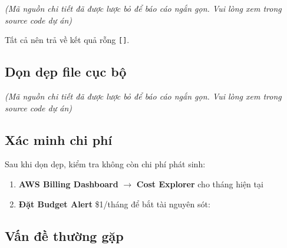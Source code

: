 \emph{(Mã nguồn chi tiết đã được lược bỏ để báo cáo ngắn gọn. Vui lòng
xem trong source code dự án)}

Tất cả nên trả về kết quả rỗng \texttt{{[}{]}}.

\hypertarget{dux1ecdn-dux1eb9p-file-cux1ee5c-bux1ed9}{%
\subsection{Dọn dẹp file cục
bộ}}

\emph{(Mã nguồn chi tiết đã được lược bỏ để báo cáo ngắn gọn. Vui lòng
xem trong source code dự án)}

\hypertarget{xuxe1c-minh-chi-phuxed}{%
\subsection{Xác minh chi phí}}

Sau khi dọn dẹp, kiểm tra không còn chi phí phát sinh:

\begin{enumerate}
\def\labelenumi{\arabic{enumi}.}
\item
  \textbf{AWS Billing Dashboard} \(\rightarrow\) \textbf{Cost Explorer}
  cho tháng hiện tại
\item
  \textbf{Đặt Budget Alert} \$1/tháng để bắt tài nguyên sót:

\begin{Shaded}
\begin{Highlighting}[]
 \VariableTok{$(}\VariableTok{)} 
\end{Highlighting}
\end{Shaded}
\end{enumerate}

\hypertarget{vux1ea5n-ux111ux1ec1-thux1b0ux1eddng-gux1eb7p}{%
\subsection{Vấn đề thường
gặp}}

